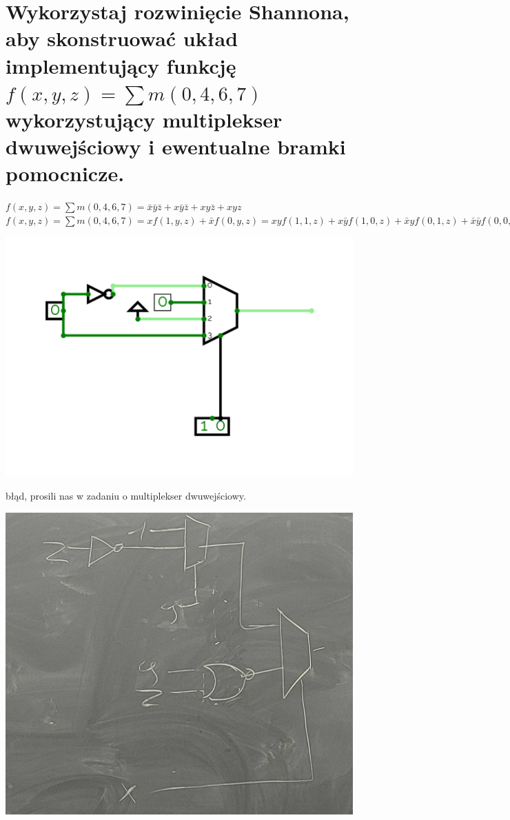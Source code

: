 \documentclass{article}
\begin{document}
\section{Wykorzystaj rozwinięcie Shannona, aby skonstruować układ implementujący funkcję $f(x, y, z) = \sum m(0, 4, 6, 7)$ wykorzystujący multiplekser dwuwejściowy i ewentualne bramki pomocnicze.}
$f(x, y, z) = \sum m(0, 4, 6, 7) = \bar{x}\bar{y}\bar{z} + x\bar{y}\bar{z} + xy\bar{z} + xyz$\\
$f(x, y, z) = \sum m(0, 4, 6, 7) = x f(1,y,z) + \bar{x}f(0,y,z) = xyf(1,1,z) + x\bar yf(1,0,z) + \bar xyf(0,1,z) + \bar x\bar yf(0,0,z)$
\begin{center}
\includegraphics[scale=0.2]{./L04_Z03.png}
\end{center}
błąd, prosili nas w zadaniu o multiplekser dwuwejściowy.
\begin{center}
\includegraphics[scale=0.2]{./L04_Z03II.jpg}
\end{center}
\end{document}
